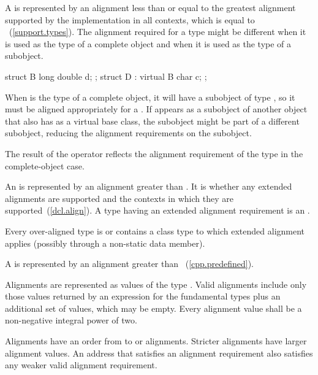 \pnum
{}%
A  is represented by an alignment
less than or equal to the greatest alignment supported by the implementation in
all contexts, which is equal to
~(\ref{support.types}).
The alignment required for a type might be different when it is used as the type
of a complete object and when it is used as the type of a subobject. \begin{example}
\begin{codeblock}
struct B { long double d; };
struct D : virtual B { char c; };
\end{codeblock}

When  is the type of a complete object, it will have a subobject of
type , so it must be aligned appropriately for a .
If  appears as a subobject of another object that also has 
as a virtual base class, the  subobject might be part of a different
subobject, reducing the alignment requirements on the  subobject.
\end{example} The result of the  operator reflects the alignment
requirement of the type in the complete-object case.

\pnum
{}%
%
%
An  is represented by an alignment
greater than . It is 
whether any extended alignments are supported and the contexts in which they are
supported~(\ref{dcl.align}). A type having an extended alignment
requirement is an . \begin{note}
Every over-aligned type is or contains a class type
to which extended alignment applies (possibly through a non-static data member).
\end{note}
A  is represented by
an alignment greater than ~(\ref{cpp.predefined}).

\pnum
Alignments are represented as values of the type .
Valid alignments include only those values returned by an 
expression for the fundamental types plus an additional 
set of values, which may be empty.
Every alignment value shall be a non-negative integral power of two.

\pnum
Alignments have an order from  to
 or  alignments. Stricter
alignments have larger alignment values. An address that satisfies an alignment
requirement also satisfies any weaker valid alignment requirement.

